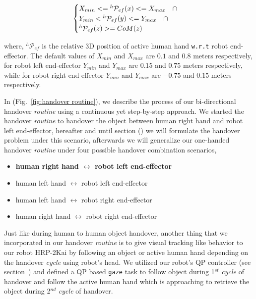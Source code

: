 \begin{equation}\label{reachable}
	\centering
	\begin{cases}
	
		X_{min} <= {}^{h}\mathcal{P}_{ef}(x) <= X_{max} \quad \cap \\
		Y_{min} < {}^{h}\mathcal{P}_{ef}(y) <= Y_{max} \quad \cap \\
		{}^{h}\mathcal{P}_{ef}(z) >= CoM(z)
			
	\end{cases}
\end{equation}

where, $ {}^{h}\mathcal{P}_{ef} $ is the relative 3D position of active human hand \texttt{w.r.t} robot end-effector. The default values of $ X_{min} $ and $ X_{max} $ are $ 0.1 $ and $ 0.8 $ meters respectively, for robot left end-effector $ Y_{min} $ and $ Y_{max} $ are $ 0.15 $ and $ 0.75 $ meters respectively, while for robot right end-effector $ Y_{min} $ and $ Y_{max} $ are $ -0.75 $ and $ 0.15 $ meters respectively.

In (Fig.~\ref{fig:handover routine}), we describe the process of our bi-directional handover \textit{routine} using a continuous yet step-by-step approach. We started the handover \textit{routine} to handover the object between human right hand and robot left end-effector, hereafter and until section () we will formulate the handover problem under this scenario, afterwards we will generalize our one-handed handover \textit{routine} under four possible handover combination scenarios,

\begin{itemize}
	\item \textbf{human right hand $\longleftrightarrow$ robot left end-effector}
	\item human left hand $\longleftrightarrow$ robot left end-effector 
	\item human left hand $\longleftrightarrow$  robot right end-effector
	\item human right hand $\longleftrightarrow$ robot right end-effector
\end{itemize}


Just like during human to human object handover, another thing that we incorporated in our handover \textit{routine} is to give visual tracking like behavior to our robot HRP-2Kai by following an object or active human hand depending on the handover \textit{cycle} using robot's head. We utilized our robot's QP controller (see section~) and defined a QP based \texttt{gaze} task to follow object during 1$^{st}$ \textit{cycle} of handover and follow the active human hand which is approaching to retrieve the object during 2$^{nd}$ \textit{cycle} of handover.

